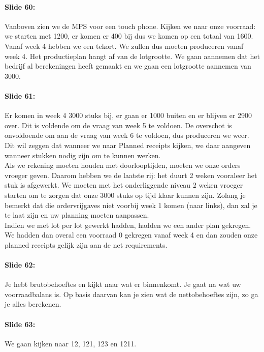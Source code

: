 \documentclass[10pt,a4paper]{report}
\begin{document}
\paragraph{Slide 60:} Vanboven zien we de MPS voor een touch phone. Kijken we naar onze voorraad: we starten met 1200, er komen er 400 bij dus we komen op een totaal van 1600. Vanaf week 4 hebben we een tekort. We zullen dus moeten produceren vanaf week 4. Het productieplan hangt af van de lotgrootte. We gaan aannemen dat het bedrijf al berekeningen heeft gemaakt en we gaan een lotgrootte aannemen van 3000. 

\paragraph{Slide 61:} %
Er komen in week 4 3000 stuks bij, er gaan er 1000 buiten en er blijven er 2900 over. Dit is voldende om de vraag van week 5 te voldoen. De overschot is onvoldoende om aan de vraag van week 6 te voldoen, dus produceren we weer. Dit wil zeggen dat wanneer we naar Planned receipts kijken, we daar aangeven wanneer stukken nodig zijn om te kunnen werken.\\ 
Als we rekening moeten houden met doorlooptijden, moeten we onze orders vroeger geven. Daarom hebben we de laatste rij: het duurt 2 weken vooraleer het stuk is afgewerkt. We moeten met het onderliggende niveau 2 weken vroeger starten om te zorgen dat onze 3000 stuks op tijd klaar kunnen zijn. Zolang je bemerkt dat die ordervrijgaves niet voorbij week 1 komen (naar links), dan zal je te laat zijn en uw planning moeten aanpassen.\\ 
Indien we met lot per lot gewerkt hadden, hadden we een ander plan gekregen. We hadden dan overal een voorraad 0 gekregen vanaf week 4 en dan zouden onze planned receipts gelijk zijn aan de net requirements.

\paragraph{Slide 62:} Je hebt brutobehoeftes en kijkt naar wat er binnenkomt. Je gaat na wat uw voorraadbalans is. Op basis daarvan kan je zien wat de nettobehoeftes zijn, zo ga je alles berekenen.

\paragraph{Slide 63:} We gaan kijken naar 12, 121, 123 en 1211.
\end{document}
